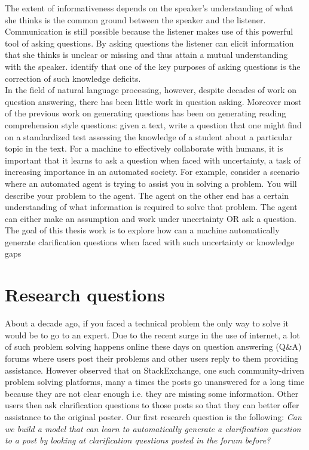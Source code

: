 \documentclass[11pt]{report}
\numberwithin{equation}{section}
\begin{document}
The extent of informativeness depends on the speaker's understanding of what she thinks is the common ground between the speaker and the listener. Communication is still possible because the listener makes use of this powerful tool of asking questions. By asking questions the listener can elicit information that she thinks is unclear or missing and thus attain a mutual understanding with the speaker. \cite{graesser2008question} identify that one of the key purposes of asking questions is the correction of such knowledge deficits.\\

\noindent
In the field of natural language processing, however, despite decades of work on question answering, there has been little work in question asking. Moreover most of the previous work on generating questions has been on generating reading comprehension style questions: given a text, write a question that one might find on a standardized test assessing the knowledge of a student about a particular topic in the text. For a machine to effectively collaborate with humans, it is important that it learns to ask a question when faced with uncertainty, a task of increasing importance in an automated society. For example, consider a scenario where an automated agent is trying to assist you in solving a problem. You will describe your problem to the agent. The agent on the other end has a certain understanding of what information is required to solve that problem. The agent can either make an assumption and work under uncertainty OR ask a question. The goal of this thesis work is to explore how can a machine automatically generate clarification questions when faced with such uncertainty or knowledge gaps

\section{Research questions}

About a decade ago, if you faced a technical problem the only way to solve it would be to go to an expert. Due to the recent surge in the use of internet, a lot of such problem solving happens online these days on question answering (Q\&A) forums where users post their problems and other users reply to them providing assistance. However \cite{asaduzzaman2013answering} observed that on StackExchange, one such community-driven problem solving platforms, many a times the posts go unanswered for a long time because they are not clear enough i.e. they are missing some information. Other users then ask clarification questions to those posts so that they can better offer assistance to the original poster. Our first research question is the following: \textit{Can we build a model that can learn to automatically generate a clarification question to a post by looking at clarification questions posted in the forum before?}\\
\end{document}
